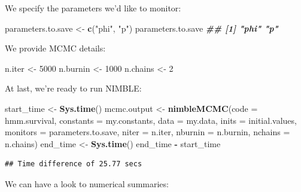 \documentclass[
  12pt,
]{krantz}
\newenvironment{Shaded}{\begin{snugshade}}{\end{snugshade}}
\newcommand{\AttributeTok}[1]{\textcolor[rgb]{0.13,0.29,0.53}{#1}}
\newcommand{\DecValTok}[1]{\textcolor[rgb]{0.00,0.00,0.81}{#1}}
\newcommand{\DocumentationTok}[1]{\textcolor[rgb]{0.56,0.35,0.01}{\textbf{\textit{#1}}}}
\newcommand{\FunctionTok}[1]{\textcolor[rgb]{0.13,0.29,0.53}{\textbf{#1}}}
\newcommand{\NormalTok}[1]{#1}
\newcommand{\OtherTok}[1]{\textcolor[rgb]{0.56,0.35,0.01}{#1}}
\newcommand{\SpecialCharTok}[1]{\textcolor[rgb]{0.81,0.36,0.00}{\textbf{#1}}}
\newcommand{\StringTok}[1]{\textcolor[rgb]{0.31,0.60,0.02}{#1}}
\begin{document}
We specify the parameters we'd like to monitor:

\begin{Shaded}
\begin{Highlighting}[]
\NormalTok{parameters.to.save }\OtherTok{\textless{}{-}} \FunctionTok{c}\NormalTok{(}\StringTok{"phi"}\NormalTok{, }\StringTok{"p"}\NormalTok{)}
\NormalTok{parameters.to.save}
\DocumentationTok{\#\# [1] "phi" "p"}
\end{Highlighting}
\end{Shaded}

We provide MCMC details:

\begin{Shaded}
\begin{Highlighting}[]
\NormalTok{n.iter }\OtherTok{\textless{}{-}} \DecValTok{5000}
\NormalTok{n.burnin }\OtherTok{\textless{}{-}} \DecValTok{1000}
\NormalTok{n.chains }\OtherTok{\textless{}{-}} \DecValTok{2}
\end{Highlighting}
\end{Shaded}

At last, we're ready to run NIMBLE:

\begin{Shaded}
\begin{Highlighting}[]
\NormalTok{start\_time }\OtherTok{\textless{}{-}} \FunctionTok{Sys.time}\NormalTok{()}
\NormalTok{mcmc.output }\OtherTok{\textless{}{-}} \FunctionTok{nimbleMCMC}\NormalTok{(}\AttributeTok{code =}\NormalTok{ hmm.survival,}
                          \AttributeTok{constants =}\NormalTok{ my.constants,}
                          \AttributeTok{data =}\NormalTok{ my.data,}
                          \AttributeTok{inits =}\NormalTok{ initial.values,}
                          \AttributeTok{monitors =}\NormalTok{ parameters.to.save,}
                          \AttributeTok{niter =}\NormalTok{ n.iter,}
                          \AttributeTok{nburnin =}\NormalTok{ n.burnin,}
                          \AttributeTok{nchains =}\NormalTok{ n.chains)}
\NormalTok{end\_time }\OtherTok{\textless{}{-}} \FunctionTok{Sys.time}\NormalTok{()}
\NormalTok{end\_time }\SpecialCharTok{{-}}\NormalTok{ start\_time}
\end{Highlighting}
\end{Shaded}

\begin{verbatim}
## Time difference of 25.77 secs
\end{verbatim}

We can have a look to numerical summaries:
\end{document}
